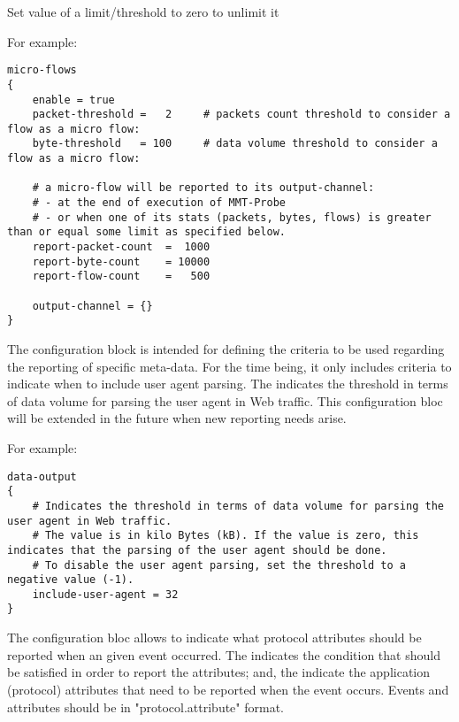 \note Set value of a limit/threshold to zero to unlimit it

For example:



\begin{lstlisting}[style=CONFIG]
micro-flows
{
    enable = true
    packet-threshold =   2     # packets count threshold to consider a flow as a micro flow:
    byte-threshold   = 100     # data volume threshold to consider a flow as a micro flow:

    # a micro-flow will be reported to its output-channel:
    # - at the end of execution of MMT-Probe
    # - or when one of its stats (packets, bytes, flows) is greater than or equal some limit as specified below.
    report-packet-count  =  1000  
    report-byte-count    = 10000
    report-flow-count    =   500

    output-channel = {}
}
\end{lstlisting}

The configuration block is intended for defining the criteria to be used regarding the reporting of specific meta-data. 
For the time being, it only includes criteria to indicate when to include user agent parsing. 
The  indicates the threshold in terms of data volume for parsing the user agent in Web traffic. 
This configuration bloc will be extended in the future when new reporting needs arise.

For example:


\begin{lstlisting}[style=CONFIG]
data-output
{
    # Indicates the threshold in terms of data volume for parsing the user agent in Web traffic.
    # The value is in kilo Bytes (kB). If the value is zero, this indicates that the parsing of the user agent should be done.
    # To disable the user agent parsing, set the threshold to a negative value (-1). 
    include-user-agent = 32
}
\end{lstlisting}

The  configuration bloc allows to indicate what protocol attributes should be reported when an given event occurred. 
The   indicates the condition that should be satisfied in order to report the attributes; 
and, the  indicate the application (protocol) attributes that need to be reported when the event occurs. 
Events and attributes should be in "protocol.attribute" format. 

